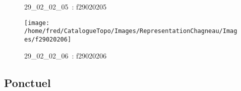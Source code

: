 \documentclass[12pt,titlepage]{book}
\begin{document}
\begin{figure}[h!]
\begin{minipage}[t]{3cm}
\begin{center}
      \caption[~29\_02\_02\_05]{\small{29\_02\_02\_05~:} \tiny{f29020205}}\label{f29020205}
    \end{center}
  \end{minipage}
  \begin{minipage}[t]{3cm}
    \begin{center}
      \texttt{[image: /home/fred/CatalogueTopo/Images/RepresentationChagneau/Images/f29020206]}
      \caption[~29\_02\_02\_06]{\small{29\_02\_02\_06~:} \tiny{f29020206}}\label{f29020206}
    \end{center}
  \end{minipage}
\end{figure}


\subsection{Ponctuel}
\noindent
\vspace{\baselineskip}
\end{document}
